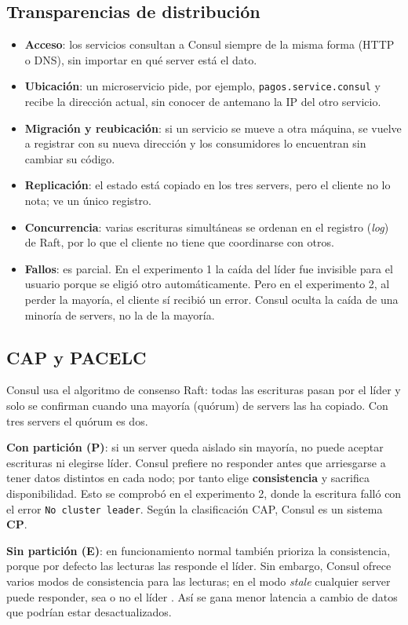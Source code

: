\documentclass[12pt,a4paper]{article}
\begin{document}
\subsection{Transparencias de distribución}
\begin{itemize}
  \item \textbf{Acceso}: los servicios consultan a Consul siempre de la misma forma (HTTP o DNS), sin importar en qué server está el dato.
  \item \textbf{Ubicación}: un microservicio pide, por ejemplo, \texttt{pagos.service.consul} y recibe la dirección actual, sin conocer de antemano la IP del otro servicio.
  \item \textbf{Migración y reubicación}: si un servicio se mueve a otra máquina, se vuelve a registrar con su nueva dirección y los consumidores lo encuentran sin cambiar su código.
  \item \textbf{Replicación}: el estado está copiado en los tres servers, pero el cliente no lo nota; ve un único registro.
  \item \textbf{Concurrencia}: varias escrituras simultáneas se ordenan en el registro (\textit{log}) de Raft, por lo que el cliente no tiene que coordinarse con otros.
  \item \textbf{Fallos}: es parcial. En el experimento 1 la caída del líder fue invisible para el usuario porque se eligió otro automáticamente. Pero en el experimento 2, al perder la mayoría, el cliente sí recibió un error. Consul oculta la caída de una minoría de servers, no la de la mayoría.
\end{itemize}

\subsection{CAP y PACELC}
Consul usa el algoritmo de consenso Raft: todas las escrituras pasan por el líder y solo se confirman cuando una mayoría (quórum) de servers las ha copiado. Con tres servers el quórum es dos.

\textbf{Con partición (P)}: si un server queda aislado sin mayoría, no puede aceptar escrituras ni elegirse líder. Consul prefiere no responder antes que arriesgarse a tener datos distintos en cada nodo; por tanto elige \textbf{consistencia} y sacrifica disponibilidad. Esto se comprobó en el experimento 2, donde la escritura falló con el error \texttt{No cluster leader}. Según la clasificación CAP, Consul es un sistema \textbf{CP}.

\textbf{Sin partición (E)}: en funcionamiento normal también prioriza la consistencia, porque por defecto las lecturas las responde el líder. Sin embargo, Consul ofrece varios modos de consistencia para las lecturas; en el modo \textit{stale} cualquier server puede responder, sea o no el líder \cite{hashicorp_consistency}. Así se gana menor latencia a cambio de datos que podrían estar desactualizados.
\end{document}
